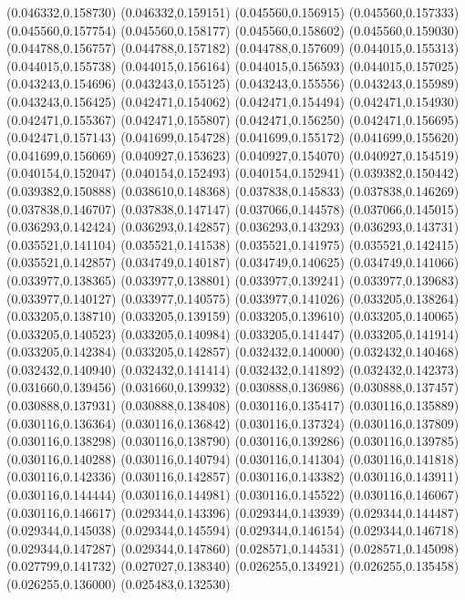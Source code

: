 (0.046332,0.158730)
(0.046332,0.159151)
(0.045560,0.156915)
(0.045560,0.157333)
(0.045560,0.157754)
(0.045560,0.158177)
(0.045560,0.158602)
(0.045560,0.159030)
(0.044788,0.156757)
(0.044788,0.157182)
(0.044788,0.157609)
(0.044015,0.155313)
(0.044015,0.155738)
(0.044015,0.156164)
(0.044015,0.156593)
(0.044015,0.157025)
(0.043243,0.154696)
(0.043243,0.155125)
(0.043243,0.155556)
(0.043243,0.155989)
(0.043243,0.156425)
(0.042471,0.154062)
(0.042471,0.154494)
(0.042471,0.154930)
(0.042471,0.155367)
(0.042471,0.155807)
(0.042471,0.156250)
(0.042471,0.156695)
(0.042471,0.157143)
(0.041699,0.154728)
(0.041699,0.155172)
(0.041699,0.155620)
(0.041699,0.156069)
(0.040927,0.153623)
(0.040927,0.154070)
(0.040927,0.154519)
(0.040154,0.152047)
(0.040154,0.152493)
(0.040154,0.152941)
(0.039382,0.150442)
(0.039382,0.150888)
(0.038610,0.148368)
(0.037838,0.145833)
(0.037838,0.146269)
(0.037838,0.146707)
(0.037838,0.147147)
(0.037066,0.144578)
(0.037066,0.145015)
(0.036293,0.142424)
(0.036293,0.142857)
(0.036293,0.143293)
(0.036293,0.143731)
(0.035521,0.141104)
(0.035521,0.141538)
(0.035521,0.141975)
(0.035521,0.142415)
(0.035521,0.142857)
(0.034749,0.140187)
(0.034749,0.140625)
(0.034749,0.141066)
(0.033977,0.138365)
(0.033977,0.138801)
(0.033977,0.139241)
(0.033977,0.139683)
(0.033977,0.140127)
(0.033977,0.140575)
(0.033977,0.141026)
(0.033205,0.138264)
(0.033205,0.138710)
(0.033205,0.139159)
(0.033205,0.139610)
(0.033205,0.140065)
(0.033205,0.140523)
(0.033205,0.140984)
(0.033205,0.141447)
(0.033205,0.141914)
(0.033205,0.142384)
(0.033205,0.142857)
(0.032432,0.140000)
(0.032432,0.140468)
(0.032432,0.140940)
(0.032432,0.141414)
(0.032432,0.141892)
(0.032432,0.142373)
(0.031660,0.139456)
(0.031660,0.139932)
(0.030888,0.136986)
(0.030888,0.137457)
(0.030888,0.137931)
(0.030888,0.138408)
(0.030116,0.135417)
(0.030116,0.135889)
(0.030116,0.136364)
(0.030116,0.136842)
(0.030116,0.137324)
(0.030116,0.137809)
(0.030116,0.138298)
(0.030116,0.138790)
(0.030116,0.139286)
(0.030116,0.139785)
(0.030116,0.140288)
(0.030116,0.140794)
(0.030116,0.141304)
(0.030116,0.141818)
(0.030116,0.142336)
(0.030116,0.142857)
(0.030116,0.143382)
(0.030116,0.143911)
(0.030116,0.144444)
(0.030116,0.144981)
(0.030116,0.145522)
(0.030116,0.146067)
(0.030116,0.146617)
(0.029344,0.143396)
(0.029344,0.143939)
(0.029344,0.144487)
(0.029344,0.145038)
(0.029344,0.145594)
(0.029344,0.146154)
(0.029344,0.146718)
(0.029344,0.147287)
(0.029344,0.147860)
(0.028571,0.144531)
(0.028571,0.145098)
(0.027799,0.141732)
(0.027027,0.138340)
(0.026255,0.134921)
(0.026255,0.135458)
(0.026255,0.136000)
(0.025483,0.132530)
